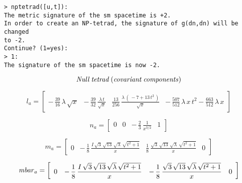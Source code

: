 \documentclass{article}
\begin{document}
{\noindent\texttt{> nptetrad([u,t]):}\\
\indent\texttt{The metric signature of the sm spacetime is +2.}\\
\indent\texttt{In order to create an NP-tetrad, the signature of g(dn,dn)
 will be changed}\\
\indent\texttt{to -2.}\\
\indent\texttt{Continue? (1=yes):}\\
\noindent\texttt{> 1:}\\
\indent\texttt{The signature of the sm spacetime is now -2.\\}

\begin{maplelatex}
\[
{\it Null\:tetrad\:(covariant\:components)}
\]
\end{maplelatex}
\begin{maplelatex}
\[
{{l}_{{a}}}= \left[
{\begin{array}{cccc}
 - \,{\displaystyle \frac {39}{16}}\,{ \lambda}\,\sqrt {{x}} & 
 - \,{\displaystyle \frac {39}{32}}\,{\displaystyle \frac {{ 
\lambda}\,{t}}{\sqrt {{x}}}} & {\displaystyle \frac {13}{256}}\,
{\displaystyle \frac {{ \lambda}\,(\, - 7 + 13\,{t}^{2}\,)}{
\sqrt {{x}}}} &  - \,{\displaystyle \frac {507}{512}}\,{ \lambda}
\,{x}\,{t}^{2} - {\displaystyle \frac {663}{512}}\,{ \lambda}\,{x
}
\end{array}}
\right] 
\]
\end{maplelatex}
\begin{maplelatex}
\[
{{n}_{{a}}}= \left[
{\begin{array}{rrcr}
0 & 0 &  - \,{\displaystyle \frac {2}{3}}\,{\displaystyle \frac {
1}{{x}^{3/2}}} & 1
\end{array}}
\right] 
\]
\end{maplelatex}
\begin{maplelatex}
\[
{{m}_{{a}}}= \left[
{\begin{array}{rccr}
0 &  - \,{\displaystyle \frac {1}{8}}\,{\displaystyle \frac {{I}
\,\sqrt {3}\,\sqrt {13}\,\sqrt {{ \lambda}}\,\sqrt {{t}^{2} + 1}
}{{x}}} & {\displaystyle \frac {1}{8}}\,{\displaystyle \frac {
\sqrt {3}\,\sqrt {13}\,\sqrt {{ \lambda}}\,\sqrt {{t}^{2} + 1}}{{
x}}} & 0
\end{array}}
\right] 
\]
\end{maplelatex}
\begin{maplelatex}
\[
{{\it mbar}_{{a}}}= \left[
{\begin{array}{rccr}
0 &  - \,{\displaystyle \frac {1}{8}}\,{\displaystyle \frac {{I}
\,\sqrt {3}\,\sqrt {13}\,\sqrt {{ \lambda}}\,\sqrt {{t}^{2} + 1}
}{{x}}} &  - \,{\displaystyle \frac {1}{8}}\,{\displaystyle 
\frac {\sqrt {3}\,\sqrt {13}\,\sqrt {{ \lambda}}\,\sqrt {{t}^{2}
 + 1}}{{x}}} & 0
\end{array}}
\right] 
\]
\end{maplelatex}

}
\end{document}
